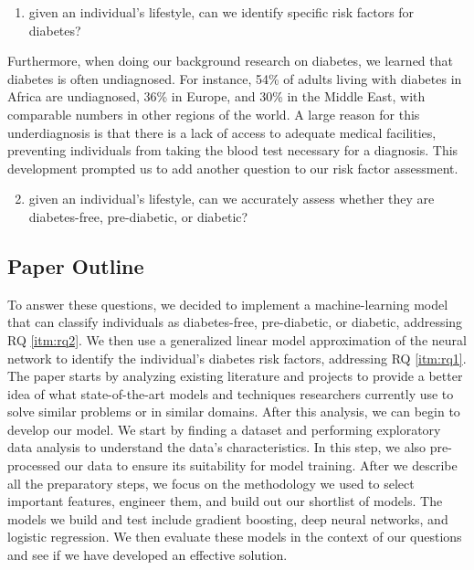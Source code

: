 \documentclass[conference]{IEEEtran}
\begin{document}
\begin{enumerate}[label=\roman*.]
    \item given an individual’s lifestyle, can we identify specific risk factors for diabetes? \label{itm:rq1}
\end{enumerate}

\indent Furthermore, when doing our background research on diabetes, we learned that diabetes is often undiagnosed. For instance, 54\% of adults living with diabetes in Africa are undiagnosed, 36\% in Europe, and 30\% in the Middle East, with comparable numbers in other regions of the world\cite{b4}. A large reason for this underdiagnosis is that there is a lack of access to adequate medical facilities, preventing individuals from taking the blood test necessary for a diagnosis\cite{b2}. This development prompted us to add another question to our risk factor assessment.

\begin{enumerate}[label=\roman*.]
    \setcounter{enumi}{1}
    \item given an individual’s lifestyle, can we accurately assess whether they are diabetes-free, pre-diabetic, or diabetic? \label{itm:rq2}
\end{enumerate}


\subsection{Paper Outline}
To answer these questions, we decided to implement a machine-learning model that can classify individuals as diabetes-free, pre-diabetic, or diabetic, addressing RQ \ref{itm:rq2}. We then use a generalized linear model approximation of the neural network to identify the individual’s diabetes risk factors, addressing RQ \ref{itm:rq1}. The paper starts by analyzing existing literature and projects to provide a better idea of what state-of-the-art models and techniques researchers currently use to solve similar problems or in similar domains. After this analysis, we can begin to develop our model. We start by finding a dataset and performing exploratory data analysis to understand the data’s characteristics. In this step, we also pre-processed our data to ensure its suitability for model training. After we describe all the preparatory steps, we focus on the methodology we used to select important features, engineer them, and build out our shortlist of models. The models we build and test include gradient boosting, deep neural networks, and logistic regression. We then evaluate these models in the context of our questions and see if we have developed an effective solution.
\end{document}
